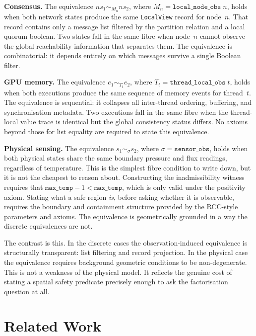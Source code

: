 \documentclass[a4paper,11pt]{article}
\begin{document}
\medskip\noindent
\textbf{Consensus.} The equivalence \(ns_1 \sim_{M_n} ns_2\), where
\(M_n = \texttt{local\_node\_obs}\;n\), holds when both network states produce
the same \texttt{LocalView} record for node~\(n\). That record contains only a
message list filtered by the partition relation and a local quorum boolean. Two
states fall in the same fibre when node~\(n\) cannot observe the global
reachability information that separates them. The equivalence is combinatorial:
it depends entirely on which messages survive a single Boolean filter.

\medskip\noindent
\textbf{GPU memory.} The equivalence \(e_1 \sim_{T_t} e_2\), where
\(T_t = \texttt{thread\_local\_obs}\;t\), holds when both executions produce
the same sequence of memory events for thread~\(t\). The equivalence is
sequential: it collapses all inter-thread ordering, buffering, and
synchronisation metadata. Two executions fall in the same fibre when the
thread-local value trace is identical but the global consistency status differs.
No axioms beyond those for list equality are required to state this equivalence.

\medskip\noindent
\textbf{Physical sensing.} The equivalence \(s_1 \sim_{\sigma} s_2\), where
\(\sigma = \texttt{sensor\_obs}\), holds when both physical states share the
same boundary pressure and flux readings, regardless of temperature. This is
the simplest fibre condition to write down, but it is not the cheapest to reason
about. Constructing the inadmissibility witness requires that
\(\texttt{max\_temp} - 1 < \texttt{max\_temp}\), which is only valid under the
positivity axiom. Stating what a safe region \emph{is}, before asking whether
it is observable, requires the boundary and containment structure provided by
the RCC-style parameters and axioms. The equivalence is geometrically
grounded in a way the discrete equivalences are not.

\medskip
The contrast is this. In the discrete cases the observation-induced equivalence
is structurally transparent: list filtering and record projection. In the
physical case the equivalence requires background geometric conditions to be
non-degenerate. This is not a weakness of the physical model. It reflects the
genuine cost of stating a spatial safety predicate precisely enough to ask the
factorisation question at all.

\section{Related Work}
\label{sec:related}
\end{document}
